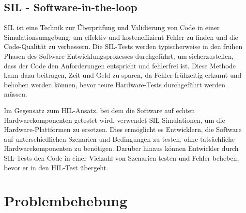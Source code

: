 \subsection{SIL - Software-in-the-loop}

\ac{SIL} ist eine Technik zur Überprüfung und Validierung von Code in einer Simulationsumgebung, um effektiv und kosteneffizient Fehler zu finden und die Code-Qualität zu verbessern. Die SIL-Tests werden typischerweise in den frühen Phasen des Software-Entwicklungsprozesses durchgeführt, um sicherzustellen, dass der Code den Anforderungen entspricht und fehlerfrei ist. Diese Methode kann dazu beitragen, Zeit und Geld zu sparen, da Fehler frühzeitig erkannt und behoben werden können, bevor teure Hardware-Tests durchgeführt werden müssen.

Im Gegensatz zum \ac{HIL}-Ansatz, bei dem die Software auf echten Hardwarekomponenten getestet wird, verwendet \ac{SIL} Simulationen, um die Hardware-Plattformen zu ersetzen. Dies ermöglicht es Entwicklern, die Software auf unterschiedlichen Szenarien und Bedingungen zu testen, ohne tatsächliche Hardwarekomponenten zu benötigen. Darüber hinaus können Entwickler durch \ac{SIL}-Tests den Code in einer Vielzahl von Szenarien testen und Fehler beheben, bevor er in den \ac{HIL}-Test übergeht.


\section{Problembehebung} \label{problembehebung:section}
